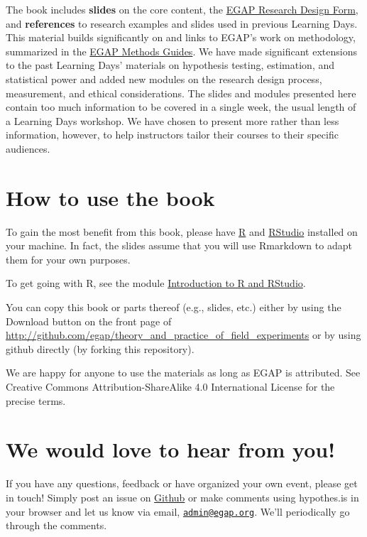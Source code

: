 \documentclass[12pt,]{book}
\begin{document}
The book includes \textbf{slides} on the core content, the \href{researchdesignform.html}{EGAP Research Design Form}, and \textbf{references} to research examples and slides used in previous Learning Days. This material builds significantly on and links to EGAP's work on methodology, summarized in the \href{https://egap.org/methods-guides/}{EGAP Methods Guides}. We have made significant extensions to the past Learning Days' materials on hypothesis testing, estimation, and statistical power and added new modules on the research design process, measurement, and ethical considerations. The slides and modules presented here contain too much information to be covered in a single week, the usual length of a Learning Days workshop. We have chosen to present more rather than less information, however, to help instructors tailor their courses to their specific audiences.

\hypertarget{how-to-use-the-book}{%
\section{How to use the book}\label{how-to-use-the-book}}

To gain the most benefit from this book, please have \href{https://cran.r-project.org/}{R} and \href{https://www.rstudio.com/products/rstudio/download/}{RStudio} installed on your machine. In fact, the slides assume that you will use Rmarkdown to adapt them for your own purposes.

To get going with R, see the module \href{introduction-to-r-and-rstudio.html}{Introduction to R and RStudio}.

You can copy this book or parts thereof (e.g., slides, etc.) either by using the Download button on the front page of \url{http://github.com/egap/theory_and_practice_of_field_experiments} or by using github directly (by forking this repository).

We are happy for anyone to use the materials as long as EGAP is attributed. See Creative Commons Attribution-ShareAlike 4.0 International License for the precise terms.

\hypertarget{we-would-love-to-hear-from-you}{%
\section{We would love to hear from you!}\label{we-would-love-to-hear-from-you}}

If you have any questions, feedback or have organized your own event, please get in touch! Simply post an issue on \href{https://github.com/egap/theory_and_practice_of_field_experiments/issues}{Github} or make comments using hypothes.is in your browser and let us know via email, \href{mailto:admin@egap.org}{\nolinkurl{admin@egap.org}}. We'll periodically go through the comments.
\end{document}
